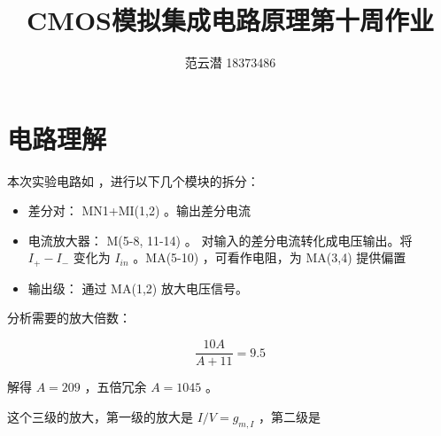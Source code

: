 \documentclass[lang=cn,11pt,a4paper,cite=authoryear]{elegantpaper}
\title{CMOS模拟集成电路原理\quad 第十周作业}
\author{范云潜 18373486}
\institute{微电子学院 184111 班}
\date{\zhtoday}
\begin{document}
\maketitle


\tableofcontents


\section{电路理解}

本次实验电路如  ，进行以下几个模块的拆分：

\begin{itemize}
    \item 差分对： MN1+MI(1,2) 。输出差分电流
    \item 电流放大器： M(5-8, 11-14) 。 对输入的差分电流转化成电压输出。将 \(I_{+} - I_{-}\) 变化为 \(I_{in}\) 。MA(5-10) ，可看作电阻，为 MA(3,4) 提供偏置
    \item 输出级： 通过 MA(1,2) 放大电压信号。
\end{itemize}

分析需要的放大倍数： 

\[\frac{10 A}{A + 11} = 9.5\]

解得 \(A = 209\) ，五倍冗余 \(A = 1045\) 。

这个三级的放大，第一级的放大是 \(I/V = g_{m,I}\) ，第二级是 \(\)


\end{document}
